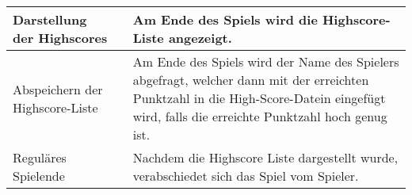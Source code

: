 \documentclass[a4paper]{article}
\begin{document}
\begin{exercise}{1}
\begin{center}
\begin{tabular}{| p{2.5cm} | p{2.2cm} | p{10cm} |}
		Darstellung der Highscores &
		& Am Ende des Spiels wird die Highscore-Liste angezeigt.\\ \hline
				
		Abspeichern der Highscore-Liste &
		& Am Ende des Spiels wird der Name des Spielers abgefragt, welcher dann mit der
		erreichten Punktzahl in die High-Score-Datein eingef\"ugt wird, falls die erreichte
		Punktzahl hoch genug ist. \\ \hline
		
		Regul\"ares Spielende &
		& Nachdem die Highscore Liste dargestellt wurde, verabschiedet sich das Spiel vom Spieler.
		\\ \hline
		
	\end{tabular}
\end{center}

\end{exercise}


\end{document}
